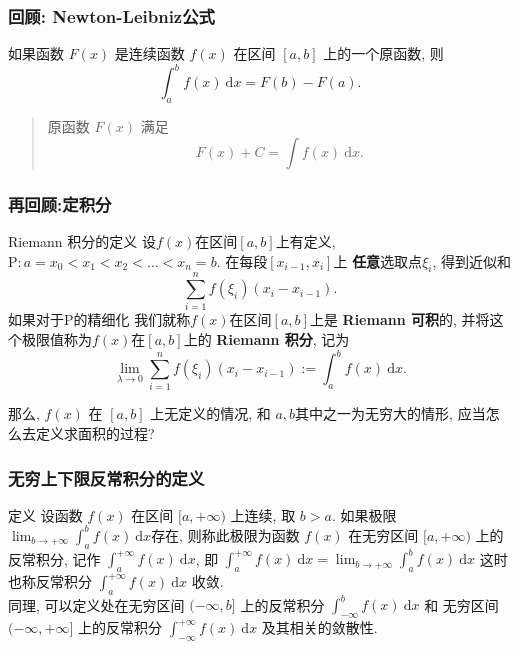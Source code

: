 \documentclass[
10pt,
aspectratio=43,
]{beamer}
\begin{document}
\begin{frame}
	\frametitle{回顾: Newton-Leibniz公式}

	\begin{theorem}
		如果函数 $F(x)$ 是连续函数 $f(x)$ 在区间 $[a, b]$ 上的一个原函数, 则
		$$
			\int_a^b f(x) \mathrm{~d} x=F(b)-F(a) .
		$$
	\end{theorem}
	\vspace{1cm}
	\pause
	\begin{quote}
		原函数 $F(x)$ 满足
		$$
			F (x)+C=\int f(x)\mathrm{~d}x.
		$$
	\end{quote}
\end{frame}


\begin{frame}
	\frametitle{再回顾:定积分}
	\begin{block}{Riemann 积分的定义}
		设$f(x)$在区间$[a,b]$上有定义, $\mathrm{P}:a=x_0<x_1<x_2<\ldots<x_n=b$.
		在每段$[x_{i-1},x_i]$上 {\bf 任意}选取点$\xi_i$, 得到近似和
		$$
			\sum_{i=1}^n f(\xi_i)(x_i-x_{i-1}).
		$$
		如果对于$\mathrm{P}$的精细化
		我们就称$f(x)$在区间$[a,b]$上是 {\bf Riemann 可积}的, 并将这个极限值称为$f(x)$在$[a,b]$上的 {\bf Riemann 积分}, 记为
		\[
			\lim_{\lambda\to 0} \sum_{i=1}^n f(\xi_i)(x_i-x_{i-1}) := \int_a^b f(x)\mathrm{~d} x.
		\]
	\end{block}
	\vspace{0.2cm}
	{\color{blue}那么, $f(x)$ 在 $[a,b]$ 上无定义的情况, 和 $a, b$其中之一为无穷大的情形, 应当怎么去定义求面积的过程?}
\end{frame}

\begin{frame}
	\frametitle{无穷上下限反常积分的定义}
	\everymath{\displaystyle}
	\begin{block}{定义}
		设函数 $f(x)$ 在区间 $[a,+\infty)$ 上连续, 取 $b>a$. 如果极限 $\lim _{b \rightarrow+\infty} \int_a^b f(x) \mathrm{~d}x$存在, 则称此极限为函数 $f(x)$ 在无穷区间 $[a,+\infty)$ 上的反常积分, 记作 $\int_a^{+\infty} f(x) \mathrm{~d}x$, 即 $\int_a^{+\infty} f(x) \mathrm{~d}x=\lim _{b \rightarrow+\infty} \int_a^b f(x) \mathrm{~d}x$
								这时也称反常积分 $\int_a^{+\infty} f(x) \mathrm{~d}x$ 收敛.\\\vspace{0.2cm}
								同理, 可以定义处在无穷区间 $(-\infty,b]$ 上的反常积分 $\int_{-\infty}^b f(x) \mathrm{~d}x$ 和 无穷区间 $(-\infty,+\infty]$ 上的反常积分 $\int_{-\infty}^{+\infty} f(x) \mathrm{~d}x$ 及其相关的敛散性.
	\end{block}
\end{frame}
\end{document}
